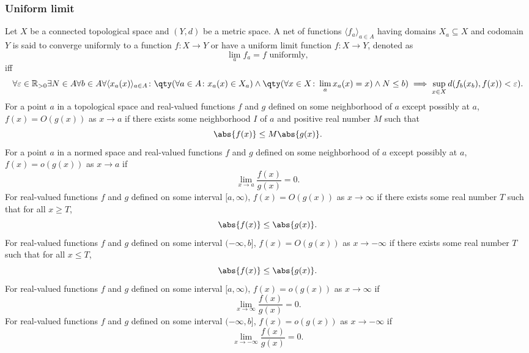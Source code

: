 \subsubsection{Uniform limit}
Let $X$ be a connected topological space and $(Y,d)$ be a metric space. A net of functions $\langle f_a\rangle_{a\in A}$ having domains $X_a\subseteq X$ and codomain $Y$ is said to converge uniformly to a function $f\colon X\to Y$ or have a uniform limit function $f\colon X\to Y$, denoted as 
\[\lim_af_a=f\text{\ uniformly},\]
iff
\[\forall\varepsilon\in\mathbb{R}_{>0}\exists N\in A\forall b\in A\forall\langle x_a(x)\rangle_{a\in A}\colon\qty(\forall a\in A\colon x_a(x)\in X_a)\land\qty(\forall x\in X\colon\lim_ax_a(x)=x)\land N\leq b)\implies\sup_{x\in X}d(f_b(x_b),f(x))<\varepsilon).\]
For a point $a$ in a topological space and real-valued functions $f$ and $g$ defined on some neighborhood of $a$ except possibly at $a$, $f(x)=O(g(x))$ as $x\to a$ if there exists some neighborhood $I$ of $a$ and positive real number $M$ such that 
\[\abs{f(x)}\leq M\abs{g(x)}.\]
For a point $a$ in a normed space and real-valued functions $f$ and $g$ defined on some neighborhood of $a$ except possibly at $a$, $f(x)=o(g(x))$ as $x\to a$ if
\[\lim_{x\to a}\frac{f(x)}{g(x)}=0.\]
For real-valued functions $f$ and $g$ defined on some interval $[a,\infty)$, $f(x)=O(g(x))$ as $x\to\infty$ if there exists some real number $T$ such that for all $x\geq T$,
\[\abs{f(x)}\leq\abs{g(x)}.\]
For real-valued functions $f$ and $g$ defined on some interval $(-\infty,b]$, $f(x)=O(g(x))$ as $x\to-\infty$ if there exists some real number $T$ such that for all $x\leq T$,
\[\abs{f(x)}\leq\abs{g(x)}.\]
For real-valued functions $f$ and $g$ defined on some interval $[a,\infty)$, $f(x)=o(g(x))$ as $x\to\infty$ if
\[\lim_{x\to\infty}\frac{f(x)}{g(x)}=0.\]
For real-valued functions $f$ and $g$ defined on some interval $(-\infty,b]$, $f(x)=o(g(x))$ as $x\to-\infty$ if
\[\lim_{x\to-\infty}\frac{f(x)}{g(x)}=0.\]
